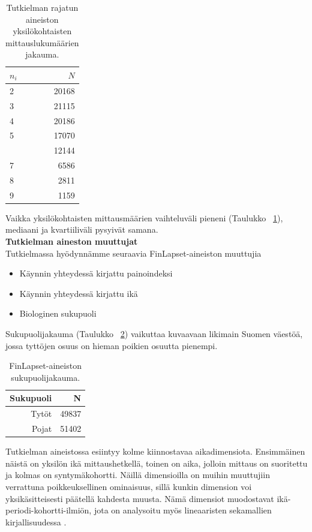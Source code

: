 \documentclass[finnish]{docopts}
\begin{document}
\begin{table}[ht]
\centering
\begin{tabular}{lr}
\toprule
$n_i$ & $N$\\
\midrule
2 & 20168\\
3 & 21115\\
4 & 20186\\
5 & 17070\\
\addlinespace
6 & 12144\\
7 & 6586\\
8 & 2811\\
9 & 1159\\
\bottomrule
\end{tabular}
\caption{Tutkielman rajatun aineiston yksilökohtaisten mittauslukumäärien jakauma.}
\label{table:mittausmaaratrajattu}
\end{table}

Vaikka yksilökohtaisten mittausmäärien vaihteluväli pieneni (Taulukko ~\ref{table:mittausmaaratrajattu}), mediaani ja kvartiiliväli pysyivät samana. \\

\textbf{Tutkielman aineston muuttujat}\\

Tutkielmassa hyödynnämme seuraavia FinLapset-aineiston muuttujia

\begin{itemize}
    \item Käynnin yhteydessä kirjattu painoindeksi
    \item Käynnin yhteydessä kirjattu ikä
    \item Biologinen sukupuoli
\end{itemize}

Sukupuolijakauma (Taulukko ~\ref{table:sukupuolijakauma}) vaikuttaa kuvaavaan likimain Suomen väestöä, jossa tyttöjen osuus on hieman poikien osuutta pienempi.\\

\begin{table}[H]
\centering
\begin{tabular}{rr}
\toprule
Sukupuoli & N\\
\midrule
Tytöt & 49837\\
Pojat & 51402\\
\bottomrule
\end{tabular}
\caption{FinLapset-aineiston sukupuolijakauma.}
\label{table:sukupuolijakauma}
\end{table}

Tutkielman aineistossa esiintyy kolme kiinnostavaa aikadimensiota. Ensimmäinen näistä on yksilön ikä mittaushetkellä, toinen on aika, jolloin mittaus on suoritettu ja kolmas on syntymäkohortti. Näillä dimensioilla on muihin muuttujiin verrattuna poikkeuksellinen ominaisuus, sillä kunkin dimension voi yksikäsitteisesti päätellä kahdesta muusta. Nämä dimensiot muodostavat ikä-periodi-kohortti-ilmiön, jota on analysoitu myös lineaaristen sekamallien kirjallisuudessa \cite{yang06}.\\
\end{document}

